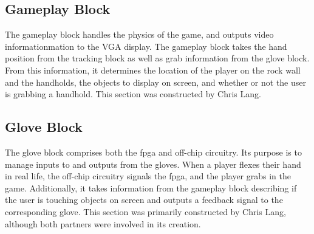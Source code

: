 \subsection{Gameplay Block}

The gameplay block handles the physics of the game, and outputs video
informationmation to the VGA display. The gameplay block takes the hand position
from the tracking block as well as grab information from the glove block. From
this information, it determines the location of the player on the rock wall and
the handholds, the objects to display on screen, and whether or not the user is
grabbing a handhold. This section was constructed by Chris Lang.

\subsection{Glove Block}

The glove block comprises both the fpga and off-chip circuitry.  Its purpose is
to manage inputs to and outputs from the gloves. When a player flexes their hand
in real life, the off-chip circuitry signals the fpga, and the player grabs in
the game. Additionally, it takes information from the gameplay block describing
if the user is touching objects on screen and outputs a feedback signal to the
corresponding glove. This section was primarily constructed by Chris Lang,
although both partners were involved in its creation.
